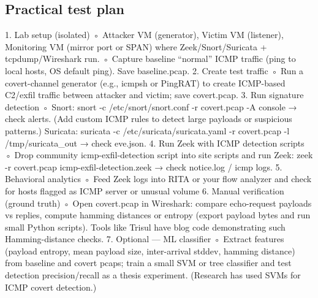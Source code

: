 \subsection{Practical test plan} 
    1. Lab setup (isolated)
        ◦ Attacker VM (generator), Victim VM (listener), Monitoring VM (mirror port or SPAN) where Zeek/Snort/Suricata + tcpdump/Wireshark run.
        ◦ Capture baseline “normal” ICMP traffic (ping to local hosts, OS default ping). Save baseline.pcap.
    2. Create test traffic 
        ◦ Run a covert-channel generator (e.g., icmpsh or PingRAT) to create ICMP-based C2/exfil traffic between attacker and victim; save covert.pcap. 
    3. Run signature detection 
        ◦ Snort: snort -c /etc/snort/snort.conf -r covert.pcap -A console → check alerts. (Add custom ICMP rules to detect large payloads or suspicious patterns.) 
        Suricata: suricata -c /etc/suricata/suricata.yaml -r covert.pcap -l /tmp/suricata\_out → check eve.json. 
    4. Run Zeek with ICMP detection scripts 
        ◦ Drop community icmp-exfil-detection script into site scripts and run Zeek:
        zeek -r covert.pcap icmp-exfil-detection.zeek → check notice.log / icmp logs. 
    5. Behavioral analytics 
        ◦ Feed Zeek logs into RITA or your flow analyzer and check for hosts flagged as ICMP server or unusual volume
    6. Manual verification (ground truth) 
        ◦ Open covert.pcap in Wireshark: compare echo-request payloads vs replies, compute hamming distances or entropy (export payload bytes and run small Python scripts). Tools like Trisul have blog code demonstrating such Hamming-distance checks. 
    7. Optional — ML classifier 
        ◦ Extract features (payload entropy, mean payload size, inter-arrival stddev, hamming distance) from baseline and covert pcaps; train a small SVM or tree classifier and test 
        detection precision/recall as a thesis experiment. (Research has used SVMs for ICMP covert detection.) 

